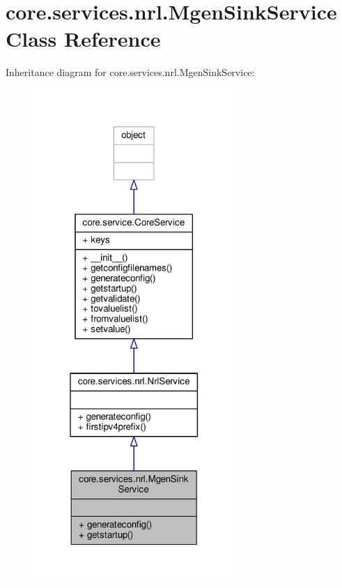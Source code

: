 \hypertarget{classcore_1_1services_1_1nrl_1_1_mgen_sink_service}{\section{core.\+services.\+nrl.\+Mgen\+Sink\+Service Class Reference}
\label{classcore_1_1services_1_1nrl_1_1_mgen_sink_service}
}


Inheritance diagram for core.\+services.\+nrl.\+Mgen\+Sink\+Service\+:
\nopagebreak
\begin{figure}[H]
\begin{center}
\leavevmode
\includegraphics[width=217pt]{classcore_1_1services_1_1nrl_1_1_mgen_sink_service__inherit__graph}
\end{center}
\end{figure}


